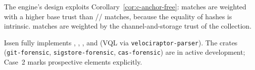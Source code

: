 The engine's design exploits Corollary~\ref{cor:c-anchor-free}: 
matches are weighted with a higher base trust than //
matches, because the equality of hashes is intrinsic.  matches are
weighted by the channel-and-storage trust of the collection.

Issen fully implements , , , and  (VQL via
\texttt{velociraptor-parser}). The  crates (\texttt{git-forensic},
\texttt{sigstore-forensic}, \texttt{cas-forensic}) are in active development;
Case~2 marks prospective elements explicitly.
